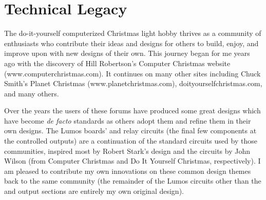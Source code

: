 \section*{Technical Legacy}\label{sec:legacy}
The do-it-yourself computerized Christmas light hobby thrives as a community of enthusiasts
who contribute their ideas and designs for others to build, enjoy, and improve upon with new
designs of their own.  
This journey began for me years ago with the discovery of Hill Robertson's Computer Christmas
website ({\ttfamily www.computerchristmas.com}).  It continues on many other sites including 
Chuck Smith's Planet Christmas ({\ttfamily www.planetchrist\-mas\-.com}), 
{\ttfamily doityourselfchristmas.com}, and many others.  

Over the years the users of these forums have produced some great designs which have become
\emph{de facto} standards as others adopt them and refine them in their own designs.  The Lumos
boards'  and  relay circuits (the final few components at the controlled
outputs) are a continuation of the standard circuits used by those communities, inspired most
by Robert Stark's  design and the   circuits by John Wilson (from Computer
Christmas and Do It Yourself Christmas, respectively).  I am pleased to contribute my own
innovations on these common design themes back to the same community (the remainder of the
Lumos circuits other than the  and  output sections are entirely
my own original design).
